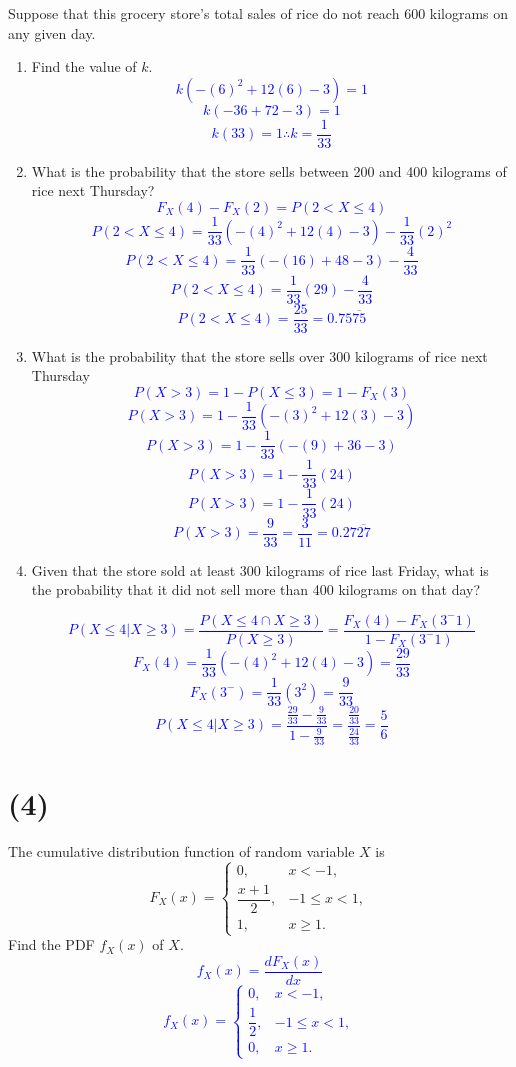 \documentclass[12pt]{article}
\begin{document}
Suppose that this grocery store’s total sales of rice do not reach 600 kilograms on any given day.
\begin{enumerate}
    \item[(a)] Find the value of $k$.
        \textcolor{blue}{\[k(-(6)^2+12(6)-3)=1\]
        \[k(-36+72-3)=1\]
        \[k(33)=1 \therefore \boxed{k=\frac{1}{33}}\]}
    \item[(b)] What is the probability that the store sells between 200 and 400 kilograms of rice next Thursday?
        \textcolor{blue}{\[F_X(4)-F_X(2)=P(2<X\leq4)\]
        \[P(2<X\leq4)=\frac{1}{33}\left(-(4)^2+12(4)-3 \right) - \frac{1}{33}(2)^2\]
        \[P(2<X\leq4)=\frac{1}{33}\left(-(16)+48-3 \right) - \frac{4}{33}\]
        \[P(2<X\leq4)=\frac{1}{33}\left(29\right) - \frac{4}{33}\]
        \[P(2<X\leq4)=\frac{25}{33}\boxed{=0.75\overline{75}}\]}
    \item[(c)] What is the probability that the store sells over 300 kilograms of rice next Thursday
        \textcolor{blue}{\[P(X>3)= 1-P(X\leq3)= 1-F_X(3)\]
        \[P(X>3)=1-\frac{1}{33}\left(-(3)^2+12(3)-3\right)\]
        \[P(X>3)=1-\frac{1}{33}\left(-(9)+36-3\right)\]
        \[P(X>3)=1-\frac{1}{33}\left(24\right)\]
        \[P(X>3)=1-\frac{1}{33}\left(24\right)\]
        \[P(X>3)=\frac{9}{33}=\frac{3}{11}\boxed{=0.27\overline{27}}\]}
    \item[(d)] Given that the store sold at least 300 kilograms of rice last Friday, what is the probability that it did not sell more than 400 kilograms on that day?
        
        \textcolor{blue}{\[P(X\leq4|X\geq3)=\frac{P(X\leq4\cap X\geq3)}{P(X\geq3)}=\frac{F_X(4)-F_X(3^-1)}{1-F_X(3^-1)}\]}
        \textcolor{blue}{\[F_X(4)=\frac{1}{33}(-(4)^2+12(4)-3)=\frac{29}{33}\]}
        \textcolor{blue}{\[F_X(3^-)=\frac{1}{33}(3^2)=\frac{9}{33}\]}
        \textcolor{blue}{\[P(X\leq4|X\geq3)=\frac{\frac{29}{33}-\frac{9}{33}}{1-\frac{9}{33}}=\frac{\frac{20}{33}}{\frac{24}{33}}=\frac{5}{6}\]}
\end{enumerate}

\section*{(4)} The cumulative distribution function of random variable $X$ is
    \[
    F_X(x) =
    \begin{cases}
    0, & x < -1, \\
    \dfrac{x+1}{2}, & -1 \leq x < 1, \\
    1, & x \geq 1.
    \end{cases}
    \]
Find the PDF $f_X(x)$ of $X$.
    \textcolor{blue}{
    \[f_X(x)=\frac{dF_X(x)}{d x} \]
    \[f_X(x) =
    \begin{cases}
    0, & x < -1, \\
    \dfrac{1}{2}, & -1 \leq x < 1, \\
    0, & x \geq 1.
    \end{cases}
    \]
    }
\end{document}
